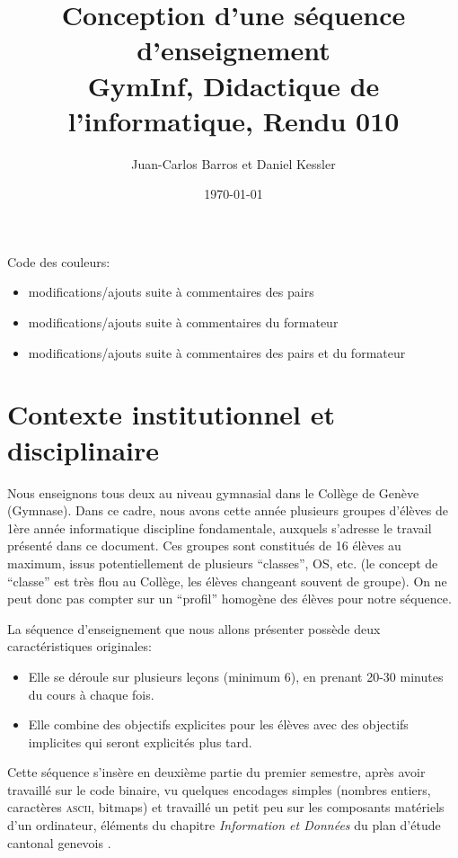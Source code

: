 \documentclass[11pt,bibliography=totoc]{scrartcl}
\author{Juan-Carlos Barros et Daniel Kessler}
\date{\today}
\title{Conception d'une séquence d'enseignement\\\medskip
  \large GymInf, Didactique de l'informatique, Rendu 010}
\newcommand\ajout[1]{{\color{blue} #1}}
\newcommand\rajout[1]{{\color{green} #1}}
\newcommand\rajouts[1]{{\color{cyan} #1}}
\begin{document}
\thispagestyle{plain}  %

\maketitle
\tableofcontents  %
\vfill
Code des couleurs:
\begin{itemize}
\item \ajout{modifications/ajouts suite à commentaires des pairs}\par
\item \rajout{modifications/ajouts suite à commentaires du formateur}\par
\item \rajouts{modifications/ajouts suite à commentaires des pairs et du formateur}\par
\end{itemize}
\vfill
\pagebreak

\section{Contexte institutionnel et disciplinaire}
Nous enseignons tous deux au niveau gymnasial dans le Collège de Genève
(Gymnase). Dans ce cadre, nous avons cette année plusieurs groupes d'élèves de
1ère année informatique discipline fondamentale, auxquels s'adresse le travail
présenté dans ce document. Ces groupes sont constitués de 16 élèves au maximum,
issus potentiellement de plusieurs ``classes'', OS, etc.  (le concept de
``classe'' est très flou au Collège, les élèves changeant souvent de groupe).
\ajout {On ne peut donc pas compter sur un ``profil'' homogène des élèves pour notre séquence.}

La séquence d'enseignement que nous allons présenter possède deux
caractéristiques originales:
\begin{itemize}
\item Elle se déroule sur plusieurs leçons (minimum  6), en prenant 20-30 minutes du cours à
  chaque fois.
\item Elle combine des objectifs explicites pour les élèves avec des objectifs
  implicites qui seront explicités plus tard.
\end{itemize}

Cette séquence s'insère en deuxième partie du premier semestre, après avoir
travaillé sur le code binaire, vu quelques encodages simples (nombres entiers,
caractères \textsc{ascii}, bitmaps) et travaillé un petit peu sur les composants
matériels d'un ordinateur, éléments du chapitre \textit{Information et Données}
du plan d'étude cantonal genevois \autocite{pecinfo}.
\end{document}
